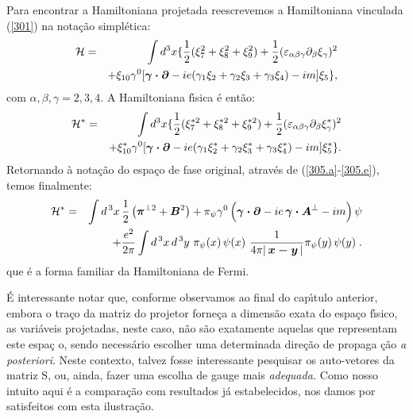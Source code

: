 \documentclass[a4paper,thmsa,12pt]{report}
\begin{document}
Para encontrar a Hamiltoniana projetada reescrevemos a Hamiltoniana
vinculada (\ref{301}) na nota\c{c}\~{a}o simpl\'{e}tica: 
\begin{eqnarray}
\mathcal{H} &=&\int d^{3}x \{\frac{1}{2}(\xi _{7}^{2}+\xi _{8}^{2}+\xi
_{9}^{2})+\frac{1}{2}(\varepsilon _{\alpha \beta \gamma }\partial _{\beta
}\xi _{\gamma })^{2}  \nonumber \\
&&+ \xi _{10}\gamma ^{0}[\mbox{\boldmath$\gamma \cdot \partial$} -ie(\gamma _{1}\xi
_{2}+\gamma _{2}\xi _{3}+\gamma _{3}\xi _{4})-im]\xi _{5} \},  \label{306}
\end{eqnarray}
com $\alpha ,\beta ,\gamma =2,3,4.$ A Hamiltoniana f\'{\i}sica \'{e} ent\~{a}o: 
\begin{eqnarray}
\mathcal{H}^{*} &=&\int d^{3}x\{\frac{1}{2}(\xi _{7}^{*2}+\xi _{8}^{*2}+\xi
_{9}^{*2})+\frac{1}{2}(\varepsilon _{\alpha \beta \gamma }\partial _{\beta
}\xi _{\gamma }^{*})^{2}  \nonumber \\
&&+\xi _{10}^{*}\gamma ^{0}[\mbox{\boldmath$\gamma \cdot \partial$}-ie(\gamma _{1}\xi
_{2}^{*}+\gamma _{2}\xi _{3}^{*}+\gamma _{3}\xi _{4}^{*})-im]\xi _{5}^{*}\}.
\label{307}
\end{eqnarray}
Retornando \`{a} nota\c{c}\~{a}o do espa\c{c}o de fase original,
atrav\'{e}s de (\ref{305.a}-\ref{305.e}), temos finalmente: 
\begin{eqnarray}
\mathcal{H}^{*}&=&\int d^{\,3}x\,\frac{1}{2}\left(\mbox{\boldmath$\pi$}^{\perp 2}+
\mbox{\boldmath$B$}^{2}\right)
+\pi _{\psi}\gamma^{0}\left(\mbox{\boldmath$\gamma\cdot\partial$}-ie\,\mbox{%
\boldmath$\gamma\cdot{A}$}^{\perp}-im\right)\psi \nonumber \\
&&+\frac{e^{2}}{2\pi}\int d^{\,3}x\,d^{\,3}y~\pi _{\psi
}(x)\,\psi(x)~\frac{1}{4\pi|\mbox{\boldmath$\,x-y\,$}|}\pi _{\psi}(y)\,\psi(y)\;.  
\label{308}
\end{eqnarray}
que \'{e} a forma familiar da Hamiltoniana de Fermi.

\'{E} interessante notar que, conforme observamos ao final do cap\'{\i}tulo
anterior, embora o tra\c{c}o da matriz do projetor forne\c{c}a a
dimens\~{a}o exata do espa\c{c}o f\'{\i}sico, as vari\'{a}veis projetadas,
neste caso, n\~{a}o s\~{a}o exatamente aquelas que representam este espa\c{c}%
o, sendo necess\'{a}rio escolher uma determinada dire\c{c}\~{a}o de propaga%
\c{c}\~{a}o \textit{a posteriori}. Neste contexto, talvez fosse interessante
pesquisar os auto-vetores da matriz S, ou, ainda, fazer uma escolha de gauge
mais \textit{adequada.} Como nosso intuito aqui \'{e} a compara\c{c}\~{a}o
com resultados j\'{a} estabelecidos, nos damos por satisfeitos com esta
ilustra\c{c}\~{a}o.
\end{document}
